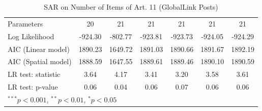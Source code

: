 \begin{table}[!h]
\begin{center}
\begin{tabular}{l c c c c c c }
Parameters              & 20           & 21           & 21           & 21           & 21           & 21           \\
Log Likelihood          & -924.30      & -802.77      & -923.81      & -923.73      & -924.05      & -924.29      \\
AIC (Linear model)      & 1890.23      & 1649.72      & 1891.03      & 1890.66      & 1891.67      & 1892.19      \\
AIC (Spatial model)     & 1888.59      & 1647.55      & 1889.61      & 1889.46      & 1890.10      & 1890.59      \\
LR test: statistic      & 3.64         & 4.17         & 3.41         & 3.20         & 3.58         & 3.61         \\
LR test: p-value        & 0.06         & 0.04         & 0.06         & 0.07         & 0.06         & 0.06         \\
\bottomrule
\multicolumn{7}{l}{\scriptsize{$^{***}p<0.001$, $^{**}p<0.01$, $^*p<0.05$}}
\end{tabular}
\caption{SAR on Number of Items of Art. 11 (GlobalLink Posts)}
\label{table:coefficients}
\end{center}
\end{table}
